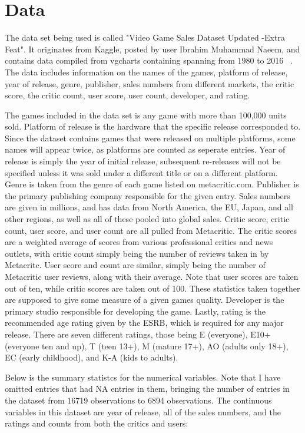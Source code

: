\documentclass[12pt]{article}
\begin{document}
\section{Data}
\label{sec:data}
The data set being used is called "Video Game Sales Dataset Updated -Extra Feat". It originates from Kaggle, posted by user 
Ibrahim Muhammad Naeem, and contains data compiled from vgcharts containing spanning from 1980 to 2016 ~\citep[(D)][]{maindataset}. 
The data includes information on the names of the games, platform of release, year of  release, genre, publisher, sales numbers 
from different markets, the critic score, the critic count, user score, user count, developer, and rating.

The games included in the data set is any game with more than 100,000 units sold. Platform of release is the hardware that the specific release corresponded to. 
Since the dataset contains games that were released on multiple platforms, some names will appear twice, as platforms are counted as seperate entries.
Year of release is simply the year of initial release, subsequent re-releases will not be specified unless 
it was sold under a different title or on a different platform. Genre is taken from the genre of each game listed on metacritic.com. 
Publisher is the primary publishing company responsible for the given entry. Sales numbers are given in millions, and has data from North 
America, the EU, Japan, and all other regions, as well as all of these pooled into global sales. Critic score, critic count, user score, and user count are 
all pulled from Metacritic. The critic scores are a weighted average of scores from various professional critics and news outlets, with 
critic count simply being the number of reviews taken in by Metacritc. User score and count are similar, simply being the number of 
Metacritic user reviews, along with their average. Note that user scores are taken out of ten, while critic scores are taken out of 100. These statistics taken together are supposed to give some measure of a given games 
quality. Developer is the primary studio responsible for developing the game. Lastly, rating is the recommended age rating given by 
the ESRB, which is required for any major release. There are seven different ratings, those being E (everyone), E10+ (everyone ten and up), 
T (teen 13+), M (mature 17+), AO (adults only 18+), EC (early childhood), and K-A (kids to adults).

Below is the summary statistcs for the numerical variables. Note that I have omitted entries that had NA entries in them, bringing the number of 
entries in the dataset from 16719 observations to 6894 observations. The continuous variables in this dataset are year of release, all of the sales 
numbers, and the ratings and counts from both the critics and users:
\end{document}
